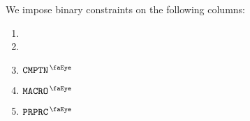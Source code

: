 We impose binary constraints on the following columns:
\begin{multicols}{3}
	\begin{enumerate}
		\item \isExpLog{}
		\item \isModexpLog{}
		\item $\isComputation$
		\item $\isMacro$
		\item $\isPreprocessing$
	\end{enumerate}
\end{multicols}
